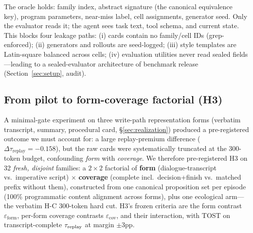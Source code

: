 The oracle holds: family index, abstract signature (the canonical equivalence key), program parameters, near-miss label, cell assignments, generator seed. Only the evaluator reads it; the agent sees task text, tool schema, and current state. This blocks four leakage paths: (i) cards contain no family/cell IDs (grep-enforced); (ii) generators and rollouts are seed-logged; (iii) style templates are Latin-square balanced across cells; (iv) evaluation utilities never read sealed fields---leading to a sealed-evaluator architecture of benchmark release (Section~\ref{sec:setup}, audit).

\subsection{From pilot to form-coverage factorial (H3)}\label{ssec:h3}

A minimal-gate experiment on three write-path representation forms (verbatim transcript, summary, procedural card, \S\ref{sec:realization}) produced a pre-registered outcome we must account for: a large replay-premium difference ($\Delta\tau_{\mathrm{replay}}=-0.158$), but the raw cards were systematically truncated at the 300-token budget, confounding \emph{form} with \emph{coverage}. We therefore pre-registered H3 on 32 \emph{fresh, disjoint} families: a $2\times2$ factorial of \textbf{form} (dialogue-transcript vs.\ imperative script) $\times$ \textbf{coverage} (complete incl.\ decision+finish vs.\ matched prefix without them), constructed from one canonical proposition set per episode (100\% programmatic content alignment across forms), plus one ecological arm---the verbatim H-C 300-token hard cut. H3's frozen criteria are the form contrast $\varepsilon_{\mathrm{form}}$, per-form coverage contrasts $\varepsilon_{\mathrm{cov}}$, and their interaction, with TOST on transcript-complete $\tau_{\mathrm{replay}}$ at margin $\pm3$pp.
